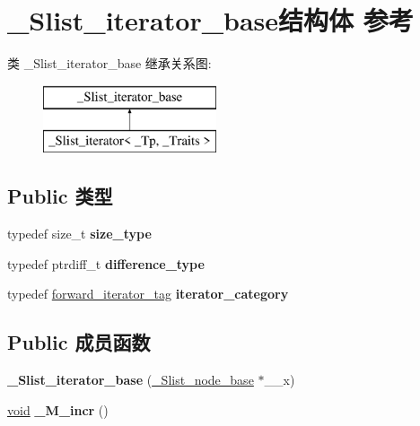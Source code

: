 \hypertarget{struct___slist__iterator__base}{}\section{\+\_\+\+Slist\+\_\+iterator\+\_\+base结构体 参考}
\label{struct___slist__iterator__base}
类 \+\_\+\+Slist\+\_\+iterator\+\_\+base 继承关系图\+:\begin{figure}[H]
\begin{center}
\leavevmode
\includegraphics[height=2.000000cm]{struct___slist__iterator__base}
\end{center}
\end{figure}
\subsection*{Public 类型}
\begin{DoxyCompactItemize}
\item 
\mbox{\label{struct___slist__iterator__base_af41a3c358c09aad74c52b516ae000794}} 
typedef size\+\_\+t {\bfseries size\+\_\+type}
\item 
\mbox{\label{struct___slist__iterator__base_ab8168d0bcde66177e90ef1e62bb1a74f}} 
typedef ptrdiff\+\_\+t {\bfseries difference\+\_\+type}
\item 
\mbox{\label{struct___slist__iterator__base_af71dcb3ddca6deee581051beab301266}} 
typedef \hyperlink{structforward__iterator__tag}{forward\+\_\+iterator\+\_\+tag} {\bfseries iterator\+\_\+category}
\end{DoxyCompactItemize}
\subsection*{Public 成员函数}
\begin{DoxyCompactItemize}
\item 
\mbox{\label{struct___slist__iterator__base_a1c32c2f503ab670eaf41e6205c21bbd4}} 
{\bfseries \+\_\+\+Slist\+\_\+iterator\+\_\+base} (\hyperlink{struct___slist__node__base}{\+\_\+\+Slist\+\_\+node\+\_\+base} $\ast$\+\_\+\+\_\+x)
\item 
\mbox{\label{struct___slist__iterator__base_a46fc5a7ad67fb180a0c1dbe2478ba2ff}} 
\hyperlink{interfacevoid}{void} {\bfseries \+\_\+\+M\+\_\+incr} ()
\end{DoxyCompactItemize}
